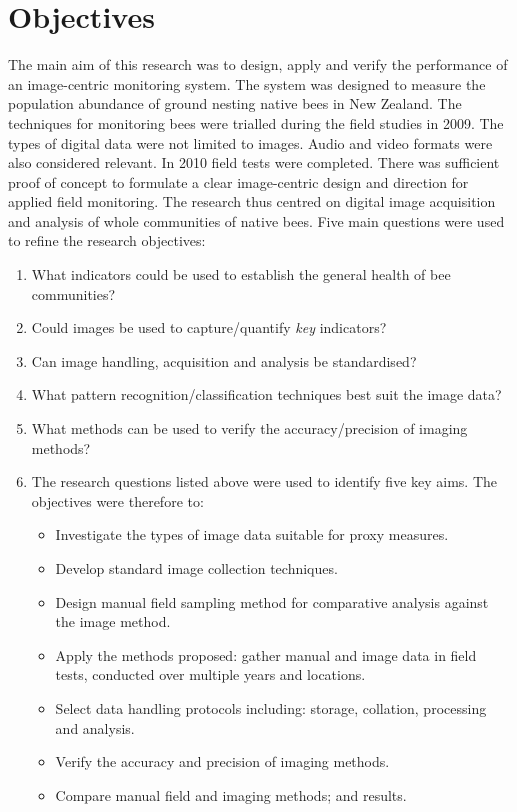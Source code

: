 \section{Objectives}\label{sec:objectives}
The main aim of this research was to design, apply and verify the performance of an image-centric monitoring system. The system was designed to measure the population abundance of ground nesting native bees in New Zealand. The techniques for monitoring bees were trialled during the field studies in 2009. The types of digital data were not limited to images. Audio and video formats were also considered relevant. In 2010 field tests were completed. There was sufficient proof of concept to formulate a clear image-centric design and direction for applied field monitoring. The research thus centred on digital image acquisition and analysis of whole communities of native bees. Five main questions were used to refine the research objectives:

\begin{enumerate}
\item What indicators could be used to establish the general health of bee communities?
\item Could images be used to capture/quantify \emph{key} indicators?
\item Can image handling, acquisition and analysis be standardised?
\item What pattern recognition/classification techniques best suit the image data?
\item What methods can be used to verify the accuracy/precision of imaging methods?
\item The research questions listed above were used to identify five key aims. The objectives were therefore to:
\begin{itemize}
\item Investigate the types of image data suitable for proxy measures.
\item Develop standard image collection techniques.
\item Design manual field sampling method for comparative analysis against the image method.
\item Apply the methods proposed: gather manual and image data in field tests, conducted over multiple years and locations.
\item Select data handling protocols including: storage, collation, processing and analysis.
\item Verify the accuracy and precision of imaging methods.
\item Compare manual field and imaging methods; and results.
\end{itemize}
\end{enumerate}

